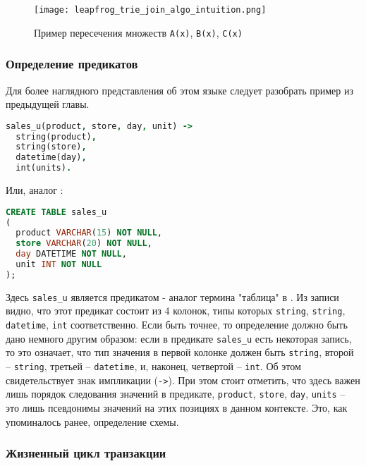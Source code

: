 \begin{figure}
	\centering
	\texttt{[image: leapfrog\_trie\_join\_algo\_intuition.png]}
	\caption{Пример пересечения множеств \lstinline{A(x)}, \lstinline{B(x)}, \lstinline{C(x)}}
	\label{fig:technology:logiql:leapfrog_trie_join_algo_intuition}
\end{figure}


\subsubsection{Определение предикатов}
\label{sec:technology:logiql:predicates}

Для более наглядного представления об этом языке следует разобрать пример из предыдущей главы.

\begin{lstlisting}[language=Prolog]
sales_u(product, store, day, unit) ->
  string(product),
  string(store),
  datetime(day),
  int(units).
\end{lstlisting}

Или, аналог \sql:

\begin{lstlisting}[language=SQL]
CREATE TABLE sales_u
(
  product VARCHAR(15) NOT NULL,
  store VARCHAR(20) NOT NULL,
  day DATETIME NOT NULL,
  unit INT NOT NULL
);
\end{lstlisting}

Здесь \lstinline{sales_u} является предикатом - аналог термина "таблица" в
\sql. Из записи видно, что этот предикат состоит из 4 колонок, типы которых \lstinline{string}, \lstinline{string}, \lstinline{datetime}, \lstinline{int} соответственно. Если быть точнее, то определение должно быть дано немного другим образом: если в предикате \lstinline{sales_u} есть некоторая запись, то это означает, что тип значения в первой колонке должен быть \lstinline{string}, второй – \lstinline{string}, третьей – \lstinline{datetime}, и, наконец, четвертой – \lstinline{int}. Об этом свидетельствует знак импликации (\lstinline{->}). При этом стоит отметить, что здесь важен лишь порядок следования значений в предикате, \lstinline{product}, \lstinline{store}, \lstinline{day}, \lstinline{units} – это лишь псевдонимы значений на этих позициях в данном контексте. Это, как упоминалось ранее, определение схемы.

\subsubsection{Жизненный цикл транзакции}
\label{sec:technology:logiql:transaction}

